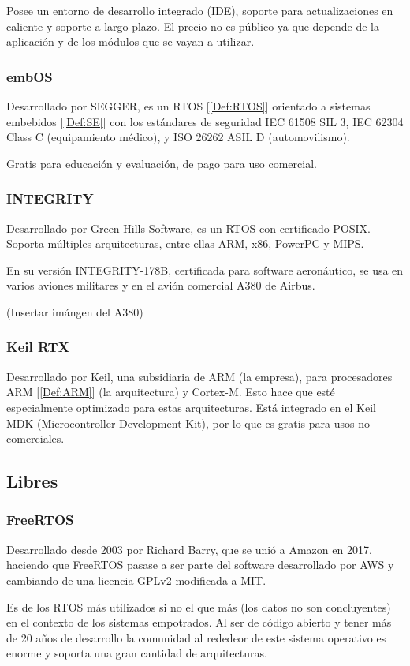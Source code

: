 Posee un entorno de desarrollo integrado (IDE), soporte para actualizaciones en caliente y soporte a largo plazo. El precio no es público ya que depende de la aplicación y de los módulos que se vayan a utilizar.

\subsubsection{embOS}
Desarrollado por SEGGER, es un RTOS [\ref{Def:RTOS}] orientado a sistemas embebidos [\ref{Def:SE}] con los estándares de seguridad IEC 61508 SIL 3, IEC 62304 Class C (equipamiento médico), y ISO 26262 ASIL D (automovilismo).

Gratis para educación y evaluación, de pago para uso comercial.

\subsubsection{INTEGRITY}
Desarrollado por Green Hills Software, es un RTOS con certificado POSIX. Soporta múltiples arquitecturas, entre ellas ARM, x86, PowerPC y MIPS.

En su versión INTEGRITY-178B, certificada para software aeronáutico, se usa en varios aviones militares y en el avión comercial A380 de Airbus.

(Insertar imángen del A380)

\subsubsection{Keil RTX}
Desarrollado por Keil, una subsidiaria de ARM (la empresa), para procesadores ARM [\ref{Def:ARM}] (la arquitectura) y Cortex-M. Esto hace que esté especialmente optimizado para estas arquitecturas. Está integrado en el Keil MDK (Microcontroller Development Kit), por lo que es gratis para usos no comerciales.

\subsection{Libres}
\subsubsection{FreeRTOS}
Desarrollado desde 2003 por Richard Barry, que se unió a Amazon en 2017, haciendo que FreeRTOS pasase a ser parte del software desarrollado por AWS y cambiando de una licencia GPLv2 modificada a MIT.

Es de los RTOS más utilizados si no el que más (los datos no son concluyentes) en el contexto de los sistemas empotrados. Al ser de código abierto y tener más de 20 años de desarrollo la comunidad al rededeor de este sistema operativo es enorme y soporta una gran cantidad de arquitecturas.

